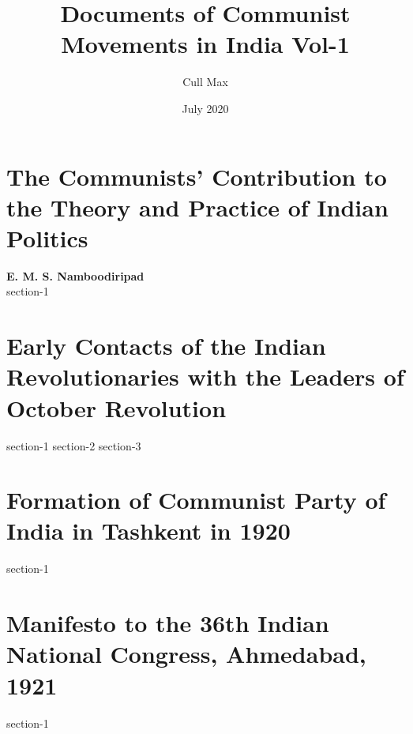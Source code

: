 \documentclass[oneside]{book}
\title{Documents of Communist Movements in India Vol-1}
\author{Cull Max}
\date{July 2020}
\begin{document}
\maketitle
\tableofcontents

\chapter{The Communists’ Contribution to the Theory and Practice of Indian Politics}
\textbf{E. M. S. Namboodiripad}\\
{section-1}

\chapter{Early Contacts of the Indian Revolutionaries with the Leaders of October Revolution}
{section-1}
{section-2}
{section-3}

\chapter{Formation of Communist Party of India in Tashkent in 1920}
{section-1}

\chapter{Manifesto to the 36th Indian National Congress, Ahmedabad, 1921}
{section-1}
\end{document}
